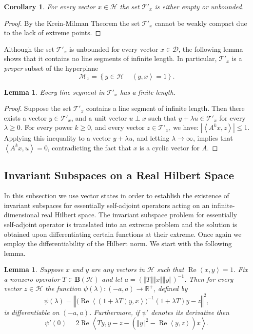 \documentclass{tran-l}
\newtheorem{cor}[thm]{Corollary}
\newtheorem{lem}[thm]{Lemma}
\theoremstyle{definition}
\theoremstyle{remark}
\numberwithin{equation}{subsection}
\DeclareMathOperator{\RE}{Re}
\newcommand{\To}{\longrightarrow}
\newcommand{\h}{\mathcal{H}}
\newcommand{\M}{\mathcal{M}}
\newcommand{\BH}{\mathbf{B}(\mathcal{H})}
\newcommand{\Real}{\mathbb{R}}
\newcommand{\RPlus}{\Real^{+}}
\newcommand{\EssD}{\mathcal{D}}
\newcommand{\States}{\mathcal{T}}
\newcommand{\abs}[1]{\left\vert#1\right\vert}
\newcommand{\set}[1]{\left\{#1\right\}}
\newcommand{\seq}[1]{\left<#1\right>}
\newcommand{\norm}[1]{\left\Vert#1\right\Vert}
\begin{document}
\begin{cor} \label{c:UNBOUND}
For every vector $x\in\h$ the set $\States'_x$ is either empty or unbounded.
\end{cor}

\begin{proof}
By the Krein-Milman Theorem the set $\States'_x$ cannot be weakly compact due to the lack of extreme points.
\end{proof}

Although the set $\States'_x$ is unbounded for every vector $x\in\EssD$, the following lemma shows that it contains no line segments of infinite length. In particular, $\States'_x$ is a \emph{proper} subset of the hyperplane
\[ \M_x=\set{y\in\h\,\,|\,\,\,\seq{y,x}=1}. \]

\begin{lem} \label{l:FL}
Every line segment in $\States'_x$ has a finite length.
\end{lem}

\begin{proof}
Suppose the set $\States'_x$ contains a line segment of infinite length. Then there exists a vector $y\in\States'_x$, and a unit vector $u\perp{x}$ such that $y+\lambda u\in\States'_x$ for every $\lambda\geq0$. For every power $k\geq0$, and every vector $z\in\States'_x$, we have: $\abs{\seq{A^k x,z}}\leq1$. Applying this inequality to a vector $y+\lambda{u}$, and letting $\lambda\to\infty$, implies that $\seq{A^k x,u}=0$, contradicting the fact that $x$ is a cyclic vector for $A$.
\end{proof}


\subsection{Invariant Subspaces on a Real Hilbert Space}
In this subsection we use vector states in order to establish the existence of invariant subspaces for essentially self-adjoint operators acting on an infinite-dimensional real Hilbert space. The invariant subspace problem for essentially self-adjoint operator is translated into an extreme problem and the solution is obtained upon differentiating certain functions at their extreme. Once again we employ the differentiability of the Hilbert norm. We start with the following lemma.

\begin{lem}\label{l:DIFF}
Suppose $x$ and $y$ are any vectors in $\h$ such that $\RE\seq{x,y}=1$. Fix a nonzero operator $T\in\BH$ and let $a=(\norm{T}\norm{x}\norm{y})^{-1}$. Then for every vector $z\in\h$ the function $\psi(\lambda)\colon(-a,a)\To\RPlus$, defined by
\[ \psi(\lambda) = \norm{
   \big(\RE\seq{(1+\lambda T)y, x}\big)^{-1}
   (1+\lambda T)y - z}^2, \]
is differentiable on $(-a,a)$. Furthermore, if $\psi'$ denotes its derivative then
\[ \psi'(0) = 2\RE\seq{T y, y - z - (\norm{y}^2-\RE\seq{y,z}) x}. \]
\end{lem}
\end{document}
